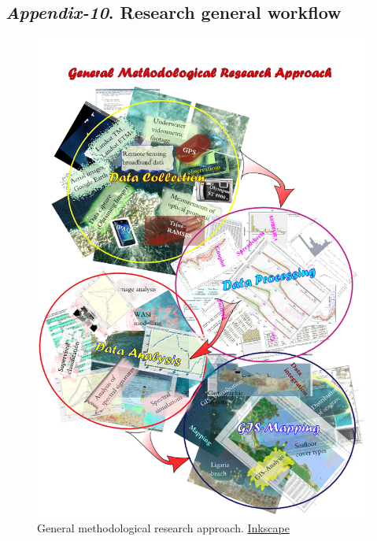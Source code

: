 \documentclass[10pt, a4paper]{article}
\begin{document}
\begin{appendices}
\subsection{\textit{Appendix-10}. Research general workflow}
\begin{figure}[H]
	\centering
	\includegraphics[scale=0.57]{UML_GIS.png}
	\caption{General methodological research approach. \href{http://inkscape.org/}{Inkscape}}
	\label{fig:1.11}
\end{figure}

\end{appendices}
\pagebreak
\clearpage
\end{document}
